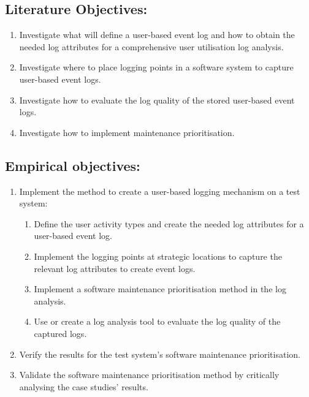 \newcommand{\objAi}{Investigate what will define a user-based event log and how to obtain the needed log attributes for a comprehensive user utilisation log analysis.}
\newcommand{\objAii}{Investigate where to place logging points in a software system to capture user-based event logs.}
\newcommand{\objAiii}{Investigate how to evaluate the log quality of the stored user-based event logs.}
\newcommand{\objAiv}{Investigate how to implement maintenance prioritisation.}

\newcommand{\objBi}{Implement the method to create a user-based logging mechanism on a test system}
\newcommand{\objBiSubA}{Define the user activity types and create the needed log attributes for a user-based event log.}
\newcommand{\objBiSubB}{Implement the logging points at strategic locations to capture the relevant log attributes to create event logs.}
\newcommand{\objBiSubC}{Use or create a log analysis tool to evaluate the log quality of the captured logs.}
\newcommand{\objBiSubD}{Implement a software maintenance prioritisation method in the log analysis.}
\newcommand{\objBii}{Verify the results for the test system's software maintenance prioritisation.}
\newcommand{\objBiii}{Validate the software maintenance prioritisation method by critically analysing the case studies' results.}


\subsection{Literature Objectives:}\label{sec:ch1_literatureObjective}
\begin{enumerate}
	\item \objAi
	\item \objAii
	\item \objAiii
	\item \objAiv 
\end{enumerate}

\subsection{Empirical objectives:}\label{sec:ch1_empiricalObjective}
\begin{enumerate}
	\item \objBi: 
		\begin{enumerate}
			\item \objBiSubA
			\item \objBiSubB
			\item \objBiSubD
			\item \objBiSubC
		\end{enumerate}
	\item \objBii
	\item \objBiii
\end{enumerate}

